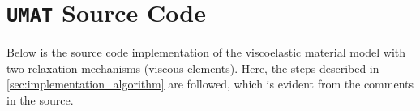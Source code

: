 \chapter{\texttt{UMAT} Source Code}%
\label{appendixA}
Below is the source code implementation of the viscoelastic material model with two relaxation mechanisms (viscous elements). Here, the steps described in \cref{sec:implementation_algorithm} are followed, which is evident from the comments in the source.
